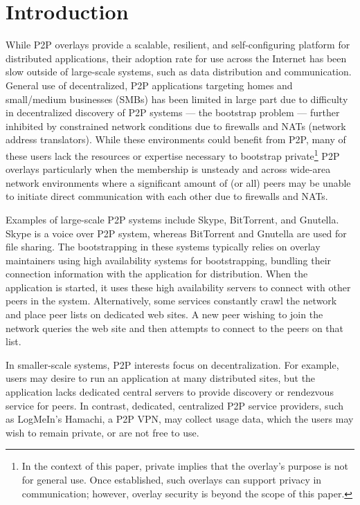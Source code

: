 \documentclass[conference]{IEEEtran}
\begin{document}
\section{Introduction}

While P2P overlays provide a scalable, resilient, and self-configuring platform
for distributed applications, their adoption rate for use across the Internet
has been slow outside of large-scale systems, such as data distribution and
communication.  General use of decentralized, P2P applications targeting homes
and small/medium businesses (SMBs) has been limited in large part due to
difficulty in decentralized discovery of P2P systems --- the bootstrap problem
--- further inhibited by constrained network conditions due to firewalls and
NATs (network address translators).  While these environments could benefit
from P2P, many of these users lack the resources or expertise necessary to
bootstrap private\footnote{In the context of this paper, private implies that
the overlay's purpose is not for general use. Once established, such overlays
can support privacy in communication; however, overlay security is beyond the
scope of this paper.} P2P overlays particularly when the membership is unsteady
and across wide-area network environments where a significant amount of (or
all) peers may be unable to initiate direct communication with each other due
to firewalls and NATs.

Examples of large-scale P2P systems include Skype, BitTorrent, and Gnutella.
Skype is a voice over P2P system, whereas BitTorrent and Gnutella are used for
file sharing.  The bootstrapping in these systems typically relies on overlay
maintainers using high availability systems for bootstrapping, bundling their
connection information with the application for distribution.  When the
application is started, it uses these high availability servers to connect with
other peers in the system.  Alternatively, some services constantly crawl the
network and place peer lists on dedicated web sites. A new peer wishing to join
the network queries the web site and then attempts to connect to the peers on
that list.

In smaller-scale systems, P2P interests focus on decentralization.  For
example, users may desire to run an application at many distributed sites, but
the application lacks dedicated central servers to provide discovery or
rendezvous service for peers.  In contrast, dedicated, centralized P2P service
providers, such as LogMeIn's Hamachi, a P2P VPN, may collect usage data, which
the users may wish to remain private, or are not free to use.
\end{document}
